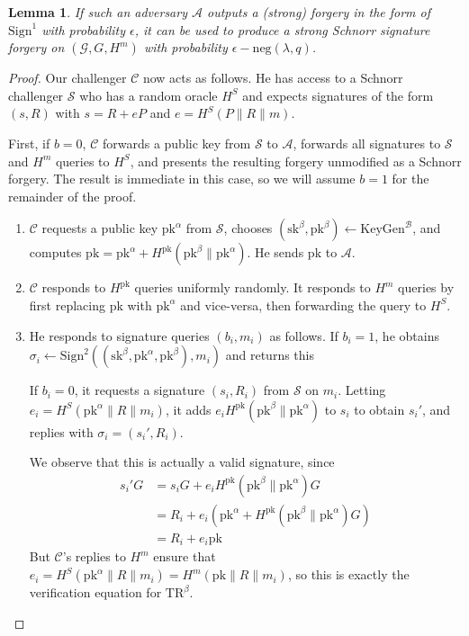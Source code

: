 \documentclass[letterpaper]{article}
\newtheorem{lmma}{Lemma}
\newcommand{\TR}[1]{\mathrm{TR}^{#1}}
\newcommand{\KeyGen}{\mathrm{KeyGen}}
\newcommand{\Sign}{\mathrm{Sign}}
\newcommand{\sk}{\mathrm{sk}}
\newcommand{\pk}{\mathrm{pk}}
\newcommand{\negl}{\mathrm{neg}}
\begin{document}
\begin{lmma} If such an adversary $\mathcal{A}$ outputs a (strong) forgery in
the form of $\Sign^1$ with probability $\epsilon$, it can be used to produce a
strong Schnorr signature forgery on $(\mathcal{G}, G, H^m)$ with probability
$\epsilon-\negl(\lambda,q)$.
\end{lmma}

\begin{proof}
Our challenger $\mathcal{C}$ now acts as follows. He has access to a Schnorr
challenger $\mathcal{S}$ who has a random oracle $H^S$ and expects signatures
of the form $(s, R)$ with $s = R + eP$ and $e = H^S(P\|R\|m)$.

First, if $b=0$, $\mathcal{C}$ forwards a public key from $\mathcal{S}$ to
$\mathcal{A}$, forwards all signatures to $\mathcal{S}$ and $H^m$ queries
to $H^S$, and presents the resulting forgery unmodified as a Schnorr forgery.
The result is immediate in this case, so we will assume $b=1$ for the
remainder of the proof.

\begin{enumerate}
\item $\mathcal{C}$ requests a public key $\pk^\alpha$ from $\mathcal{S}$,
chooses $(\sk^\beta, \pk^\beta)\gets\KeyGen^\mathcal{B}$, and computes
$\pk=\pk^\alpha+H^\pk(\pk^\beta\|\pk^\alpha)$. He sends $\pk$ to
$\mathcal{A}$.

\item $\mathcal{C}$ responds to $H^\pk$ queries uniformly randomly. It
responds to $H^m$ queries by first replacing $\pk$ with $\pk^\alpha$
and vice-versa, then forwarding the query to $H^S$.

\item He responds to signature queries $(b_i, m_i)$ as follows. If $b_i=1$,
he obtains $\sigma_i\gets\Sign^2((\sk^\beta, \pk^\alpha,\pk^\beta), m_i)$
and returns this

If $b_i=0$, it requests a signature $(s_i,R_i)$ from $\mathcal{S}$ on $m_i$.
Letting $e_i=H^S(\pk^\alpha\|R\|m_i)$, it adds $e_iH^\pk(\pk^\beta\|\pk^\alpha)$
to $s_i$ to obtain $s_i'$, and replies with $\sigma_i = (s_i', R_i)$.

We observe that this is actually a valid signature, since
\begin{align*}
s_i'G
    &= s_iG + e_iH^\pk(\pk^\beta\|\pk^\alpha)G	\\
    &= R_i + e_i(\pk^\alpha + H^\pk(\pk^\beta\|\pk^\alpha)G)	\\
    &= R_i + e_i\pk
\end{align*}
But $\mathcal{C}$'s replies to $H^m$ ensure that $e_i=H^S(\pk^\alpha\|R\|m_i)
=H^m(\pk\|R\|m_i)$, so this is exactly the verification equation for
$\TR\beta$.


\end{enumerate}
\end{proof}
\end{document}
